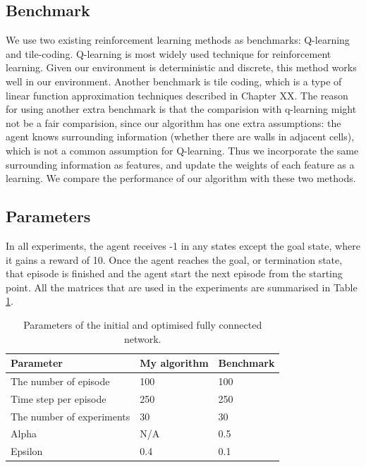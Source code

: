 \subsection{Benchmark}
We use two existing reinforcement learning methods as benchmarks: Q-learning and tile-coding. 
Q-learning is most widely used technique for reinforcement learning. Given our environment is deterministic and discrete, this method works well in our environment.
Another benchmark is tile coding, which is a type of linear function approximation techniques described in Chapter XX.
The reason for using another extra benchmark is that the comparision with q-learning might not be a fair comparision,
since our algorithm has one extra assumptions: the agent knows surrounding information (whether there are walls in adjacent cells),
which is not a common assumption for Q-learning. Thus we incorporate the same surrounding information as features, and update the weights of each feature as a learning.
We compare the performance of our algorithm with these two methods.

\subsection{Parameters}
In all experiments, the agent receives -1 in any states except the goal state, where it gains a reward of 10.
Once the agent reaches the goal, or termination state, that episode is finished and the agent start the next episode from the starting point.
All the matrices that are used in the experiments are summarised in Table \ref{param}. 

\begin{table}[!ht!b]
\centering
\begin{tabular}{lll}
\hline
Parameter            & My algorithm    & Benchmark      \\ \hline
The number of episode& 100        & 100        \\
Time step per episode& 250        & 250        \\
The number of experiments& 30       & 30       \\
Alpha                & N/A       & 0.5       \\
Epsilon              & 0.4        & 0.1        \\
\end{tabular}
\caption{Parameters of the initial and optimised fully connected network.}
\label{param}
\end{table}

